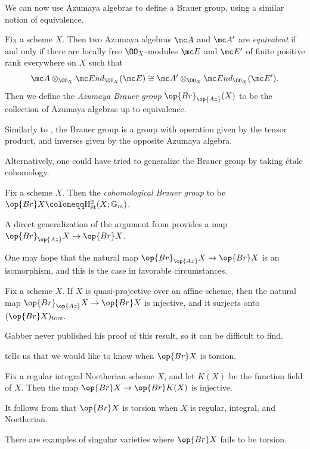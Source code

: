 \documentclass[../notes.tex]{subfiles}
\begin{document}
We can now use Azumaya algebras to define a Brauer group, using a similar notion of equivalence.
\begin{definition}
	Fix a scheme $X$. Then two Azumaya algebras $\mc A$ and $\mc A'$ are \textit{equivalent} if and only if there are locally free $\OO_X$-modules $\mc E$ and $\mc E'$ of finite positive rank everywhere on $X$ such that
	\[\mc A\otimes_{\OO_X}\mc End_{\OO_X}(\mc E)\cong\mc A'\otimes_{\OO_X}\mc End_{\OO_X}(\mc E').\]
	Then we define the \textit{Azumaya Brauer group} $\op{Br}_{\op{Az}}(X)$ to be the collection of Azumaya algebras up to equivalence.
\end{definition}
\begin{remark}
	Similarly to , the Brauer group is a group with operation given by the tensor product, and inverses given by the opposite Azumaya algebra.
\end{remark}
Alternatively, one could have tried to generalize the Brauer group by taking \'etale cohomology.
\begin{definition}
	Fix a scheme $X$. Then the \textit{cohomological Brauer group} to be $\op{Br}X\coloneqq\mathrm H^2_{\mathrm{\acute et}}(X;\mathbb G_m)$.
\end{definition}
\begin{remark}
	A direct generalization of the argument from  provides a map $\op{Br}_{\op{Az}}X\to\op{Br}X$.
\end{remark}
One may hope that the natural map $\op{Br}_{\op{Az}}X\to\op{Br}X$ is an isomorphism, and this is the case in favorable circumstances.
\begin{theorem} \label{thm:gabber}
	Fix a scheme $X$. If $X$ is quasi-projective over an affine scheme, then the natural map $\op{Br}_{\op{Az}}X\to\op{Br}X$ is injective, and it surjects onto $(\op{Br}X)_{\mathrm{tors}}$.
\end{theorem}
\begin{remark}
	Gabber never published his proof of this result, so it can be difficult to find.
\end{remark}
 tells us that we would like to know when $\op{Br}X$ is torsion.
\begin{proposition} \label{prop:function-field-injective}
	Fix a regular integral Noetherian scheme $X$, and let $K(X)$ be the function field of $X$. Then the map $\op{Br}X\to\op{Br}K(X)$ is injective.
\end{proposition}
\begin{remark}
	It follows from  that $\op{Br}X$ is torsion when $X$ is regular, integral, and Noetherian.
\end{remark}
\begin{remark}
	There are examples of singular varieties where $\op{Br}X$ fails to be torsion.
\end{remark}
\end{document}

